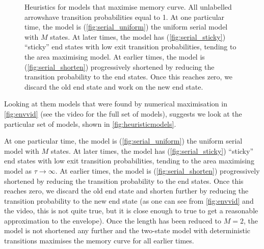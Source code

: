 \documentclass[12pt]{article}
\newenvironment{myenuma}{\begin{inparaenum}[(a)]}{\end{inparaenum}}
\begin{document}
\begin{figure}[tb]
  \centering
  \begin{myenuma}
    \item{}\hspace{0.02\linewidth}\label{fig:serial_uniform}
    \item{}\hspace{0.02\linewidth}\label{fig:serial_sticky}
    \item{}\label{fig:serial_shorten}
  \end{myenuma}
  \caption[Heuristic optimal models]{Heuristics for models that maximise memory curve.
  All unlabelled arrowshave transition probabilities equal to 1.
  At one particular time, the model is (\ref{fig:serial_uniform}) the uniform serial model with \(M\) states.
  At later times, the model has (\ref{fig:serial_sticky}) ``sticky'' end states with low exit transition probabilities, tending to the area maximising model.
  At earlier times, the model is (\ref{fig:serial_shorten}) progressively shortened by reducing the transition probability to the end states.
  Once this reaches zero, we discard the old end state and work on the new end state.} \label{fig:heuristicmodels}
\end{figure}


Looking at them models that were found by numerical maximisation in \autoref{fig:envvid} (see the video for the full set of models), suggests we look at the particular set of models, shown in \autoref{fig:heuristicmodels}.

At one particular time, the model is (\ref{fig:serial_uniform}) the uniform serial model with \(M\) states.
At later times, the model has (\ref{fig:serial_sticky}) ``sticky'' end states with low exit transition probabilities, tending to the area maximising model as \(\tau \to \infty\).
At earlier times, the model is (\ref{fig:serial_shorten}) progressively shortened by reducing the transition probability to the end states.
Once this reaches zero, we discard the old end state and shorten further by reducing the transition probability to the new end state (as one can see from \autoref{fig:envvid} and the video, this is not quite true, but it is close enough to true to get a reasonable approximation to the envelope).
Once the length has been reduced to \(M=2\), the model is not shortened any further and the two-state model with deterministic transitions maximises the memory curve for all earlier times.
\end{document}
